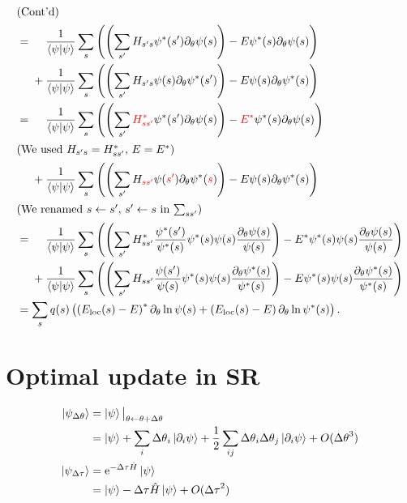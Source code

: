 \begin{align}
\intertext{(Cont'd)}
&= \phantom{{}+{}}\frac{1}{\ip{\psi}} \sum_s \left( \left( \sum_{s'} H_{s' s} \psi^*(s') \pp_\theta \psi(s) \right) - E \psi^*(s) \pp_\theta \psi(s) \right) \nonumber \\
&\phantom{{}={}}+ \frac{1}{\ip{\psi}} \sum_s \left( \left( \sum_{s'} H_{s' s} \psi(s) \pp_\theta \psi^*(s') \right) - E \psi(s) \pp_\theta \psi^*(s) \right) \\
&= \phantom{{}+{}}\frac{1}{\ip{\psi}} \sum_s \left( \left( \sum_{s'} {\color{red} H^*_{s s'}} \psi^*(s') \pp_\theta \psi(s) \right) - {\color{red} E^*} \psi^*(s) \pp_\theta \psi(s) \right) \nonumber \\
\intertext{(We used $H_{s' s} = H^*_{s s'}$, $E = E^*$)}
&\phantom{{}={}}+ \frac{1}{\ip{\psi}} \sum_s \left( \left( \sum_{s'} H_{\color{red} s s'} \psi({\color{red} s'}) \pp_\theta \psi^*({\color{red} s}) \right) - E \psi(s) \pp_\theta \psi^*(s) \right) \\
\intertext{(We renamed $s \gets s'$, $s' \gets s$ in $\sum_{s s'}$)}
%
&= \phantom{{}+{}}\frac{1}{\ip{\psi}} \sum_s \left( \left( \sum_{s'} H_{s s'}^* \frac{\psi^*(s')}{\psi^*(s)} \psi^*(s) \psi(s) \frac{\pp_\theta \psi(s)}{\psi(s)} \right) - E^* \psi^*(s) \psi(s) \frac{\pp_\theta \psi(s)}{\psi(s)} \right) \nonumber \\
&\phantom{{}={}}+ \frac{1}{\ip{\psi}} \sum_s \left( \left( \sum_{s'} H_{s s'} \frac{\psi(s')}{\psi(s)} \psi^*(s) \psi(s) \frac{\pp_\theta \psi^*(s)}{\psi^*(s)} \right) - E \psi^*(s) \psi(s) \frac{\pp_\theta \psi^*(s)}{\psi^*(s)} \right) \\
&= \sum_s q(s) \left( \left( E_\text{loc}(s) - E \right)^* \pp_\theta \ln \psi(s) + \left( E_\text{loc}(s) - E \right) \pp_\theta \ln \psi^*(s) \right).
\end{align}

\iffalse
\chapter{Optimal update in SR}

\begin{align}
\ket{\psi_\dth}
&= \ket{\psi} \big|_{\theta \gets \theta + \dth} \nonumber \\
&= \ket{\psi}
+ \sum_i \dth_i \ket{\pp_i \psi}
+ \frac{1}{2} \sum_{i j} \dth_i \dth_j \ket{\pp_i \psi}
+ O(\dth^3) \\
%
\ket{\psi_\dta}
&= \rme^{-\dta \hat{H}} \ket{\psi} \nonumber \\
&= \ket{\psi} - \dta \hat{H} \ket{\psi} + O(\dta^2)
\end{align}

